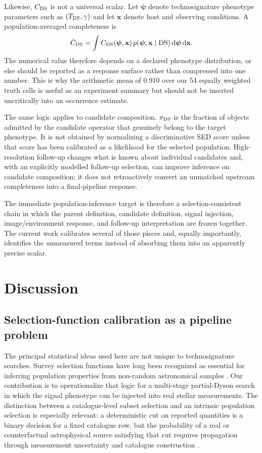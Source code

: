 \documentclass[fleqn,usenatbib]{mnras}
\begin{document}
Likewise, $C_{\rm DS}$ is not a universal scalar. Let $\boldsymbol\psi$ denote technosignature phenotype parameters such as $(T_{\rm DS},\gamma)$ and let $\mathbf{x}$ denote host and observing conditions. A population-averaged completeness is
\begin{equation}
\bar C_{\rm DS}=
\int C_{\rm DS}(\boldsymbol\psi,\mathbf{x})
\,p(\boldsymbol\psi,\mathbf{x}\mid{\rm DS})
\,{\rm d}\boldsymbol\psi\,{\rm d}\mathbf{x}.
\label{eq:marginal_completeness}
\end{equation}
The numerical value therefore depends on a declared phenotype distribution, or else should be reported as a response surface rather than compressed into one number. This is why the arithmetic mean of 0.910 over our 54 equally weighted truth cells is useful as an experiment summary but should not be inserted uncritically into an occurrence estimate.

The same logic applies to candidate composition. $\pi_{\rm DS}$ is the fraction of objects admitted by the candidate operator that genuinely belong to the target phenotype. It is not obtained by normalizing a discriminative SED score unless that score has been calibrated as a likelihood for the selected population. High-resolution follow-up changes what is known about individual candidates and, with an explicitly modelled follow-up selection, can improve inference on candidate composition; it does not retroactively convert an unmatched upstream completeness into a final-pipeline response.

The immediate population-inference target is therefore a selection-consistent chain in which the parent definition, candidate definition, signal injection, image/environment response, and follow-up interpretation are frozen together. The current work calibrates several of those pieces and, equally importantly, identifies the unmeasured terms instead of absorbing them into an apparently precise scalar.

\section{Discussion}

\subsection{Selection-function calibration as a pipeline problem}

The principal statistical ideas used here are not unique to technosignature searches. Survey selection functions have long been recognized as essential for inferring population properties from non-random astronomical samples \citep{EverallDas2020,BoubertEverall2022}. Our contribution is to operationalize that logic for a multi-stage partial-Dyson search in which the signal phenotype can be injected into real stellar measurements. The distinction between a catalogue-level subset selection and an intrinsic population selection is especially relevant: a deterministic cut on reported quantities is a binary decision for a fixed catalogue row, but the probability of a real or counterfactual astrophysical source satisfying that cut requires propagation through measurement uncertainty and catalogue construction \citep{BoubertEverall2022}.
\end{document}
